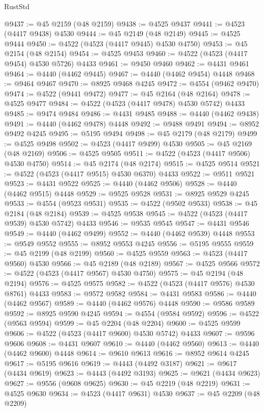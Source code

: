 \begin{lexlean}{RustStd}
\begin{coremodule}
{\begin{coremodule}
{{{{{{{{{{{{{{{{{{{{{{{{{{{{{{{{{{{{{{{{{{{{{{{{{{{{{{{{{{{{@9437 := @45 @2159 (@48 @2159)
@9438 := @4525 @9437
@9441 := @4523 (@4417 @9438) @4530
@9444 := @45 @2149 (@48 @2149)
@9445 := @4525 @9444
@9450 := @4522 (@4523 (@4417 @9445) @4530 @4750)
@9453 := @45 @2154 (@48 @2154)
@9454 := @4525 @9453
@9460 := @4522 (@4523 (@4417 @9454) @4530 @5726) @4433
@9461 := @9450 @9460
@9462 := @4431 @9461
@9464 := @4440 (@4462 @9445)
@9467 := @4440 (@4462 @9454) @4448
@9468 := @9464 @9467
@9470 := @8925 @9468 @4245
@9472 := @4554 (@9462 @9470)
@9474 := @4522 (@9441 @9472)
@9477 := @45 @2164 (@48 @2164)
@9478 := @4525 @9477
@9484 := @4522 (@4523 (@4417 @9478) @4530 @5742) @4433
@9485 := @9474 @9484
@9486 := @4431 @9485
@9488 := @4440 (@4462 @9438)
@9491 := @4440 (@4462 @9478) @4448
@9492 := @9488 @9491
@9494 := @8952 @9492 @4245
@9495 := @5195 @9494
@9498 := @45 @2179 (@48 @2179)
@9499 := @4525 @9498
@9502 := @4523 (@4417 @9499) @4530
@9505 := @45 @2169 (@48 @2169)
@9506 := @4525 @9505
@9511 := @4522 (@4523 (@4417 @9506) @4530 @4750)
@9514 := @45 @2174 (@48 @2174)
@9515 := @4525 @9514
@9521 := @4522 (@4523 (@4417 @9515) @4530 @6370) @4433
@9522 := @9511 @9521
@9523 := @4431 @9522
@9525 := @4440 (@4462 @9506)
@9528 := @4440 (@4462 @9515) @4448
@9529 := @9525 @9528
@9531 := @8925 @9529 @4245
@9533 := @4554 (@9523 @9531)
@9535 := @4522 (@9502 @9533)
@9538 := @45 @2184 (@48 @2184)
@9539 := @4525 @9538
@9545 := @4522 (@4523 (@4417 @9539) @4530 @5742) @4433
@9546 := @9535 @9545
@9547 := @4431 @9546
@9549 := @4440 (@4462 @9499)
@9552 := @4440 (@4462 @9539) @4448
@9553 := @9549 @9552
@9555 := @8952 @9553 @4245
@9556 := @5195 @9555
@9559 := @45 @2199 (@48 @2199)
@9560 := @4525 @9559
@9563 := @4523 (@4417 @9560) @4530
@9566 := @45 @2189 (@48 @2189)
@9567 := @4525 @9566
@9572 := @4522 (@4523 (@4417 @9567) @4530 @4750)
@9575 := @45 @2194 (@48 @2194)
@9576 := @4525 @9575
@9582 := @4522 (@4523 (@4417 @9576) @4530 @8761) @4433
@9583 := @9572 @9582
@9584 := @4431 @9583
@9586 := @4440 (@4462 @9567)
@9589 := @4440 (@4462 @9576) @4448
@9590 := @9586 @9589
@9592 := @8925 @9590 @4245
@9594 := @4554 (@9584 @9592)
@9596 := @4522 (@9563 @9594)
@9599 := @45 @2204 (@48 @2204)
@9600 := @4525 @9599
@9606 := @4522 (@4523 (@4417 @9600) @4530 @5742) @4433
@9607 := @9596 @9606
@9608 := @4431 @9607
@9610 := @4440 (@4462 @9560)
@9613 := @4440 (@4462 @9600) @4448
@9614 := @9610 @9613
@9616 := @8952 @9614 @4245
@9617 := @5195 @9616
@9619 := @4443 (@4492 @3187)
@9621 := @9617 (@4434 @9619)
@9623 := @4443 (@4492 @3193)
@9625 := @9621 (@4434 @9623)
@9627 := @9556 (@9608 @9625)
@9630 := @45 @2219 (@48 @2219)
@9631 := @4525 @9630
@9634 := @4523 (@4417 @9631) @4530
@9637 := @45 @2209 (@48 @2209)
}}}}}}}}}}}}}}}}}}}}}}}}}}}}}}}}}}}}}}}}}}}}}}}}}}}}}}}}}}}}
\end{coremodule}}
\end{coremodule}
\end{lexlean}
